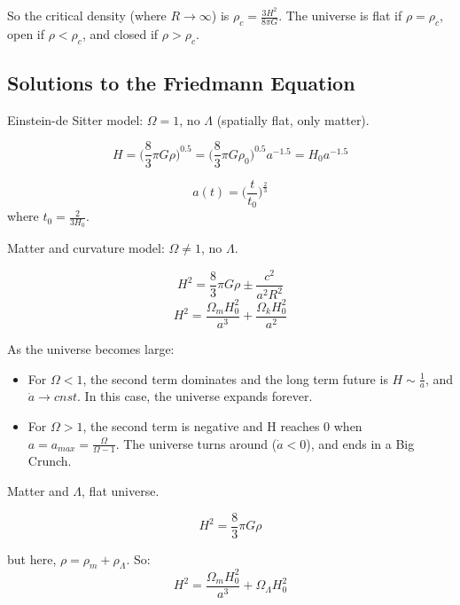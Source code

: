 So the critical density (where $R \rightarrow \infty$) is $\rho_c = \frac{3H^2}{8\pi G}$.  The universe is flat if $\rho = \rho_c$, open if $\rho < \rho_c$, and closed if $\rho > \rho_c$.

\subsection{Solutions to the Friedmann Equation}

Einstein-de Sitter model:  $\Omega = 1$, no $\Lambda$ (spatially flat, only matter).

\begin{equation}
H = \bigg(\frac{8}{3}\pi G\rho \bigg)^{0.5} = \bigg(\frac{8}{3}\pi G\rho_0 \bigg)^{0.5}a^{-1.5} = H_0a^{-1.5}
\end{equation}

\begin{equation}
a(t) = \bigg(\frac{t}{t_0}\bigg)^{\frac{2}{3}}
\end{equation}
where $t_0 = \frac{2}{3H_0}$.  

Matter and curvature model:  $\Omega \ne 1$, no $\Lambda$.

\begin{equation}
H^2 = \frac{8}{3}\pi G\rho \pm \frac{c^2}{a^2R^2}
\end{equation}
\begin{equation}
H^2 = \frac{\Omega_mH_0^2}{a^3} + \frac{\Omega_kH_0^2}{a^2}
\end{equation}

As the universe becomes large:
\begin{itemize}
\item For $\Omega < 1$, the second term dominates and the long term future is $H \sim \frac{1}{a}$, and $\dot a \rightarrow cnst$.  In this case, the universe expands forever.
\item For $\Omega > 1$, the second term is negative and H reaches 0 when $a = a_{max} = \frac{\Omega}{\Omega - 1}$.  The universe turns around ($\dot a < 0$), and ends in a Big Crunch.
\end{itemize}

Matter and $\Lambda$, flat universe.

\begin{equation}
H^2 = \frac{8}{3}\pi G\rho
\end{equation}

but here, $\rho = \rho_m + \rho_\Lambda$.  So:
\begin{equation}
H^2 = \frac{\Omega_mH_0^2}{a^3} + \Omega_\Lambda H_0^2
\end{equation}


